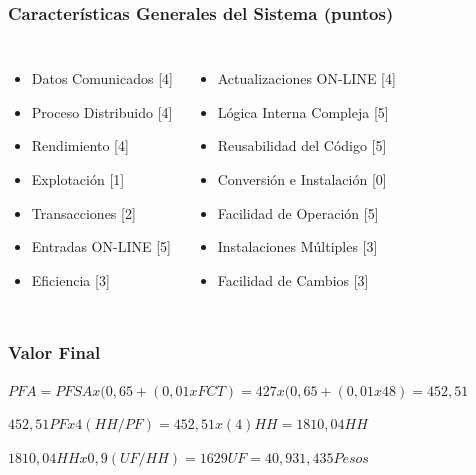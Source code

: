 \documentclass{beamer}
\begin{document}

\begin{frame}
\frametitle{Características Generales del Sistema (puntos)}
\begin{columns}[c] %

\begin{itemize}
\item Datos Comunicados [4]
\item Proceso Distribuido [4]
\item Rendimiento [4]
\item Explotación [1]
\item Transacciones [2]
\item Entradas ON-LINE [5]
\item Eficiencia [3]
\end{itemize}

\begin{itemize}
\item Actualizaciones ON-LINE [4]
\item Lógica Interna Compleja [5]
\item Reusabilidad del Código [5]
\item Conversión e Instalación [0]
\item Facilidad de Operación [5]
\item Instalaciones Múltiples [3]
\item Facilidad de Cambios [3]
\end{itemize}

\end{columns}
\end{frame}


\begin{frame}
\frametitle{Valor Final}
\begin{theorem}
$PFA = PFSA x (0,65 + (0,01 x FCT) = 427 x (0,65 + (0,01 x 48) = 452,51$
\end{theorem}
\begin{theorem}
$452,51PF x 4(HH/PF) = 452,51 x (4)HH = 1810,04HH$
\end{theorem}
\begin{theorem}
$1810,04HH x 0,9(UF/HH) = 1629UF = 40,931,435Pesos$
\end{theorem}
\end{frame}
\end{document}
